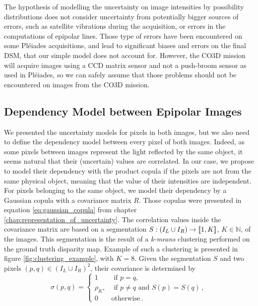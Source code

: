 \begin{remark}
    The hypothesis of modelling the uncertainty on image intensities by possibility distributions does not consider uncertainty from potentially bigger sources of errors, such as satellite vibrations during the acquisition, or errors in the computations of epipolar lines. Those type of errors have been encountered on some Pléiades acquisitions, and lead to significant biases and errors on the final DSM, that our simple model does not account for. However, the CO3D mission will acquire images using a CCD matrix sensor and not a push-broom sensor as used in Pléiades, so we can safely assume that those problems should not be encountered on images from the CO3D mission.
\end{remark}

\subsection{Dependency Model between Epipolar Images}
We presented the uncertainty models for pixels in both images, but we also need to define the dependency model between every pixel of both images. Indeed, as some pixels between images represent the light reflected by the same object, it seems natural that their (uncertain) values are correlated. In our case, we propose to model their dependency with the product copula if the pixels are not from the same physical object, meaning that the value of their intensities are independent. For pixels belonging to the same object, we model their dependency by a Gaussian copula with a covariance matrix $R$. Those copulas were presented in equation \eqref{eq:gaussian_copula} from chapter \ref{chap:representation_of_uncertainty}. The correlation values inside the covariance matrix are based on a segmentation $S:(I_L\cup I_R)\rightarrow{[\![}1,K{]\!]}$, $K\in\mathbb{N}$, of the images. This segmentation is the result of a \textit{k-means} clustering performed on the ground truth disparity map. Example of such a clustering is presented in figure \ref{fig:clustering_example}, with $K=8$. Given the segmentation $S$ and two pixels $(p, q)\in(I_L\cup I_R)^2$, their covariance is determined by
\begin{equation}
    \sigma(p, q) =
    \begin{cases}
        1 &\text{ if }p=q,\\
        \rho_K, &\text{ if } p\ne q\text{ and }S(p)=S(q)\,, \\
        0 & \text{otherwise}\,.
    \end{cases}\label{eq:correlation}
\end{equation}
